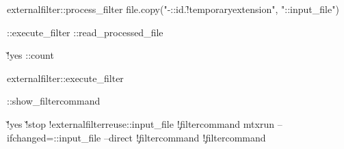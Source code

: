\starttexdefinition externalfilter::process_filter
     \startmode[\s!mkiv]
         \startluacode
           file.copy("\jobname-\externalfilter::id.\f!temporaryextension", "\externalfilter::input_file")
         \stopluacode
     \stopmode
           

     \externalfilter::execute_filter
     \externalfilter::read_processed_file
     \endgroup 

     \v!yes
          {\doglobal\expandafter\increment\csname\externalfilter::count\endcsname}

     \dorechecknextindentation
\stoptexdefinition


\starttexdefinition externalfilter::execute_filter

   \externalfilter::show_filtercommand

   \v!yes
       {\v!stop
            {\showmessage\m!externalfilter{reuse}\externalfilter::input_file}
            {
               {
                   {
                    \executesystemcommand
                      {\externalfilterparameter\c!filtercommand}}
                   {\executesystemcommand
                    {mtxrun --ifchanged=\externalfilter::input_file\space 
                        --direct \externalfilterparameter\c!filtercommand}}}}}
       {\executesystemcommand
          {\externalfilterparameter\c!filtercommand}}
\stoptexdefinition

